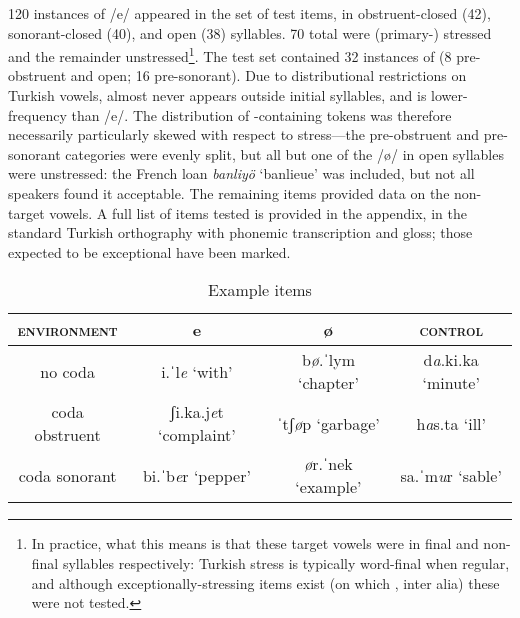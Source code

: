 120 instances of /e/ appeared in the set of test items, in obstruent-closed (42), sonorant-closed (40), and open (38) syllables. 70 total were (primary-) stressed and the remainder unstressed\footnote{In practice, what this means is that these target vowels were in final and non-final syllables respectively: Turkish stress is typically word-final when regular, and although exceptionally-stressing items exist (on which \citealt{Inkelas1999, Kabak2001,Inkelas2003}, inter alia) these were not tested.}. The test set contained 32 instances of \ur{\o} (8 pre-obstruent and open; 16 pre-sonorant). Due to distributional restrictions on Turkish vowels, \ur{\o} almost never appears outside initial syllables, and is lower-frequency than /e/. The distribution of \ur{\o}-containing tokens was therefore necessarily particularly skewed with respect to stress---the pre-obstruent and pre-sonorant categories were evenly split, but all but one of the /\o/ in open syllables were unstressed: the French loan \textit{banliyö} `banlieue' was included, but not all speakers found it acceptable. The remaining items provided data on the non-target vowels. A full list of items tested is provided in the appendix, in the standard Turkish orthography with phonemic transcription and gloss; those expected to be exceptional have been marked.

\begin{table}[H]
\centering
\begin{tabular}{cccc}
  \toprule
\textsc{environment} & e & \o & \textsc{control} \\
\midrule
no coda & i.ˈl\textit{e} `with' & b\textit{\o}.ˈlym `chapter' & d\textit{a}.ki.ka `minute' \\
coda obstruent & ʃi.ka.j\textit{e}t `complaint' & ˈtʃ\textit{ø}p `garbage' & h\textit{a}s.ta `ill' \\
coda sonorant & bi.ˈb\textit{e}r `pepper' & \textit{ø}r.ˈnek `example' & sa.ˈm\textit{u}r `sable' \\
\bottomrule
\end{tabular}
\caption{Example items}
\label{tab:tr_wordlist}
\end{table}

